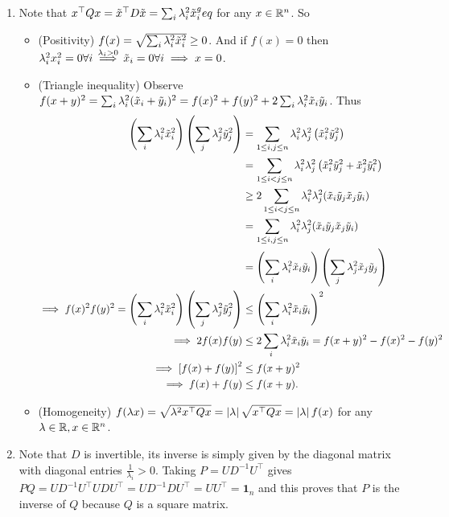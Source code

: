 \begin{enumerate}[leftmargin=*]
\item Note that $x^\top Qx = {\tilde{x}}^\top D {\tilde{x}} = \sum_i \lambda_i^2{\tilde{x}}_i^geq$ for any $x\in\mathbb{R}^n$. So \begin{itemize}
\item (Positivity) $f(x) = \sqrt{\sum_i \lambda_i^2{\tilde{x}}_i^2} \geq 0$. And if $f(x) = 0$ then $\lambda_i^2x_i^2 = 0\forall i\stackrel{\lambda_i>0}{\implies} {\tilde{x}}_i = 0\forall i\implies x = 0$.
\item (Triangle inequality) Observe $f(x+y)^2= \sum_i \lambda_i^2({\tilde{x}}_i+{\tilde{y}}_i)^2 = f(x)^2 + f(y)^2 + 2\sum_i \lambda_i^2{\tilde{x}}_i{\tilde{y}}_i$.
Thus \begin{align*}
\left(\sum_i\lambda_i^2{\tilde{x}}_i^2\right)\left(\sum_j\lambda_j^2{\tilde{y}}_j^2\right)
&=\sum_{1\leq i,j\leq n} \lambda_i^2\lambda_j^2 \left({\tilde{x}}_i^2{\tilde{y}}_j^2\right) \\
&= \sum_{1\leq i<j\leq n} \lambda_i^2\lambda_j^2 \left({\tilde{x}}_i^2{\tilde{y}}_j^2+{\tilde{x}}_j^2{\tilde{y}}_i^2\right)\\
&\geq 2\sum_{1\leq i<j\leq n} \lambda_i^2\lambda_j^2 ({\tilde{x}}_i{\tilde{y}}_j{\tilde{x}}_j{\tilde{y}}_i)\\
&= \sum_{1\leq i,j\leq n} \lambda_i^2\lambda_j^2 ({\tilde{x}}_i{\tilde{y}}_j{\tilde{x}}_j{\tilde{y}}_i)\\
&= \left(\sum_i\lambda_i^2{\tilde{x}}_i{\tilde{y}}_i\right)\left(\sum_j\lambda_j^2{\tilde{x}}_j{\tilde{y}}_j\right)\\
\implies f(x)^2f(y)^2 = \left(\sum_i\lambda_i^2{\tilde{x}}_i^2\right)\left(\sum_j\lambda_j^2{\tilde{y}}_j^2\right) &\leq \left(\sum_i\lambda_i^2{\tilde{x}}_i{\tilde{y}}_i\right)^2\\
\implies 2f(x)f(y)  &\leq 2\sum_i\lambda_i^2{\tilde{x}}_i{\tilde{y}}_i = f(x+y)^2-f(x)^2-f(y)^2\\
\implies \left[f(x) + f(y)\right]^2 &\leq f(x+y)^2\\
\implies f(x) + f(y) &\leq f(x+y).
\end{align*}
\item (Homogeneity) $f(\lambda x) = \sqrt{\lambda^2 x^\top Qx} = \left| \lambda \right|\sqrt{x^\top Qx} = \left| \lambda \right| f(x)$ for any $\lambda\in\mathbb{R},x\in\mathbb{R}^n$.
\end{itemize}
\item  Note that $D$ is invertible, its inverse is simply given by the diagonal matrix with diagonal entries $\frac{1}{\lambda_i}>0$. Taking $P = UD^{-1}U^\top$ gives $PQ = UD^{-1}U^\top UDU^\top = UD^{-1}DU^\top = UU^\top = \pmb 1_n$ and this proves that $P$ is the inverse of $Q$ because $Q$ is a square matrix. 


\end{enumerate}
